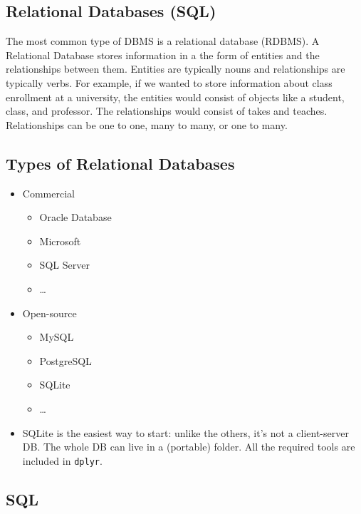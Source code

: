 \documentclass[]{book}
\providecommand{\tightlist}{%
  \setlength{\itemsep}{0pt}\setlength{\parskip}{0pt}}
\theoremstyle{definition}
\theoremstyle{definition}
\theoremstyle{definition}
\theoremstyle{remark}
\begin{document}
\subsection{Relational Databases (SQL)}\label{relational-databases-sql}

The most common type of DBMS is a relational database (RDBMS). A
Relational Database stores information in a the form of entities and the
relationships between them. Entities are typically nouns and
relationships are typically verbs. For example, if we wanted to store
information about class enrollment at a university, the entities would
consist of objects like a student, class, and professor. The
relationships would consist of takes and teaches. Relationships can be
one to one, many to many, or one to many.

\subsection{Types of Relational
Databases}\label{types-of-relational-databases}

\begin{itemize}
\tightlist
\item
  Commercial

  \begin{itemize}
  \tightlist
  \item
    Oracle Database
  \item
    Microsoft
  \item
    SQL Server
  \item
    \ldots{}
  \end{itemize}
\item
  Open-source

  \begin{itemize}
  \tightlist
  \item
    MySQL
  \item
    PostgreSQL
  \item
    SQLite
  \item
    \ldots{}
  \end{itemize}
\item
  SQLite is the easiest way to start: unlike the others, it's not a
  client-server DB. The whole DB can live in a (portable) folder. All
  the required tools are included in \texttt{dplyr}.
\end{itemize}

\subsection{SQL}\label{sql}
\end{document}

